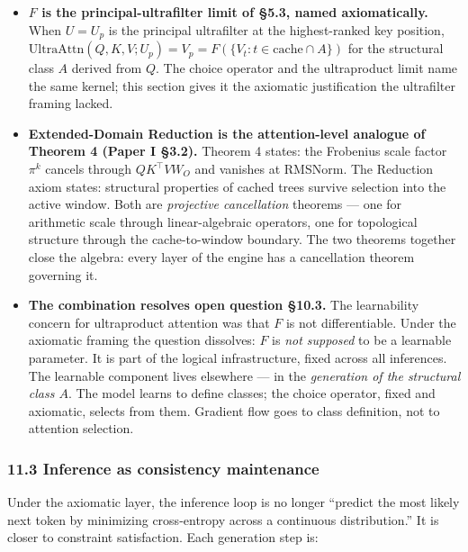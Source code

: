 \documentclass[
  11pt,
]{article}
\begin{document}
\begin{itemize}
\item
  \textbf{\(F\) is the principal-ultrafilter limit of §5.3, named
  axiomatically.} When \(U = U_p\) is the principal ultrafilter at the
  highest-ranked key position,
  \(\mathrm{UltraAttn}(Q,K,V; U_p) = V_p = F(\{V_t : t \in \mathrm{cache} \cap A\})\)
  for the structural class \(A\) derived from \(Q\). The choice operator
  and the ultraproduct limit name the same kernel; this section gives it
  the axiomatic justification the ultrafilter framing lacked.
\item
  \textbf{Extended-Domain Reduction is the attention-level analogue of
  Theorem 4 (Paper I §3.2).} Theorem 4 states: the Frobenius scale
  factor \(\pi^k\) cancels through \(QK^\top V W_O\) and vanishes at
  RMSNorm. The Reduction axiom states: structural properties of cached
  trees survive selection into the active window. Both are
  \emph{projective cancellation} theorems --- one for arithmetic scale
  through linear-algebraic operators, one for topological structure
  through the cache-to-window boundary. The two theorems together close
  the algebra: every layer of the engine has a cancellation theorem
  governing it.
\item
  \textbf{The combination resolves open question §10.3.} The
  learnability concern for ultraproduct attention was that \(F\) is not
  differentiable. Under the axiomatic framing the question dissolves:
  \(F\) is \emph{not supposed} to be a learnable parameter. It is part
  of the logical infrastructure, fixed across all inferences. The
  learnable component lives elsewhere --- in the \emph{generation of the
  structural class \(A\)}. The model learns to define classes; the
  choice operator, fixed and axiomatic, selects from them. Gradient flow
  goes to class definition, not to attention selection.
\end{itemize}

\hypertarget{inference-as-consistency-maintenance}{%
\subsubsection{11.3 Inference as consistency
maintenance}\label{inference-as-consistency-maintenance}}

Under the axiomatic layer, the inference loop is no longer ``predict the
most likely next token by minimizing cross-entropy across a continuous
distribution.'' It is closer to constraint satisfaction. Each generation
step is:
\end{document}
